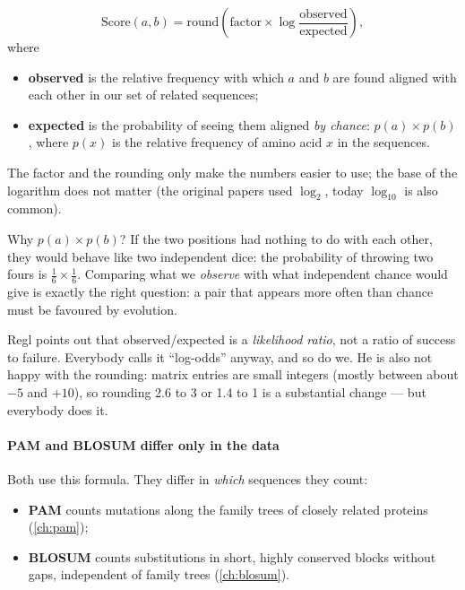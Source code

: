 \documentclass[11pt, oneside]{book}
\newcommand{\obs}{\mathrm{observed}}
\newcommand{\expd}{\mathrm{expected}}
\begin{document}
\begin{thmbox}[title={Log-odds score (the common core of PAM and BLOSUM)}]
\[
  \mathrm{Score}(a,b) = \mathrm{round}\!\left( \text{factor} \times
    \log \frac{\obs}{\expd} \right),
\]
where
\begin{itemize}
  \item \textbf{observed} is the relative frequency with which $a$ and $b$ are
    found aligned with each other in our set of related sequences;
  \item \textbf{expected} is the probability of seeing them aligned \emph{by
    chance}: $p(a) \times p(b)$, where $p(x)$ is the relative frequency of
    amino acid $x$ in the sequences.
\end{itemize}
The factor and the rounding only make the numbers easier to use; the base of
the logarithm does not matter (the original papers used $\log_2$, today
$\log_{10}$ is also common).
\end{thmbox}

Why $p(a) \times p(b)$? If the two positions had nothing to do with each
other, they would behave like two independent dice: the probability of
throwing two fours is $\frac16 \times \frac16$. Comparing what we
\emph{observe} with what independent chance would give is exactly the right
question: a pair that appears more often than chance must be favoured by
evolution.

\begin{notebox}[title={Strictly speaking, not ``odds''}]
Regl points out that observed/expected is a \emph{likelihood ratio}, not a
ratio of success to failure. Everybody calls it ``log-odds'' anyway, and so do
we. He is also not happy with the rounding: matrix entries are small integers
(mostly between about $-5$ and $+10$), so rounding 2.6 to 3 or 1.4 to 1 is a
substantial change --- but everybody does it.
\end{notebox}

\paragraph{PAM and BLOSUM differ only in the data}
Both use this formula. They differ in \emph{which} sequences they count:
\begin{itemize}
  \item \textbf{PAM} counts mutations along the family trees of closely related
    proteins (\cref{ch:pam});
  \item \textbf{BLOSUM} counts substitutions in short, highly conserved
    blocks without gaps, independent of family trees (\cref{ch:blosum}).
\end{itemize}
\end{document}
